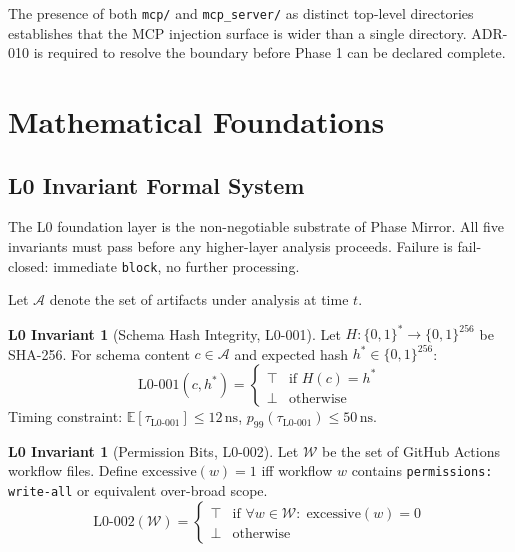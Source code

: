 \documentclass[12pt,a4paper]{article}
\theoremstyle{definition}
\newtheorem{invariant}[theorem]{L0 Invariant}
\theoremstyle{remark}
\begin{document}
The presence of both \texttt{mcp/} and \texttt{mcp\_server/} as distinct
top-level directories establishes that the MCP injection surface is wider
than a single directory. ADR-010 is required to resolve the boundary before
Phase 1 can be declared complete.


\section{Mathematical Foundations}

\subsection{L0 Invariant Formal System}

The L0 foundation layer is the non-negotiable substrate of Phase Mirror.
All five invariants must pass before any higher-layer analysis proceeds.
Failure is fail-closed: immediate \texttt{block}, no further processing.

Let $\mathcal{A}$ denote the set of artifacts under analysis at time $t$.

\begin{invariant}[Schema Hash Integrity, L0-001]
\label{inv:schema-hash}
Let $H: \{0,1\}^* \rightarrow \{0,1\}^{256}$ be SHA-256. For schema content
$c \in \mathcal{A}$ and expected hash $h^* \in \{0,1\}^{256}$:
\[
  \text{L0-001}(c, h^*) = \begin{cases}
    \top & \text{if } H(c) = h^* \\
    \bot & \text{otherwise}
  \end{cases}
\]
Timing constraint: $\mathbb{E}[\tau_{\text{L0-001}}] \leq 12\,\text{ns}$,
$p_{99}(\tau_{\text{L0-001}}) \leq 50\,\text{ns}$.
\end{invariant}

\begin{invariant}[Permission Bits, L0-002]
\label{inv:permission-bits}
Let $\mathcal{W}$ be the set of GitHub Actions workflow files.
Define $\text{excessive}(w) = 1$ iff workflow $w$ contains
\texttt{permissions: write-all} or equivalent over-broad scope.
\[
  \text{L0-002}(\mathcal{W}) = \begin{cases}
    \top & \text{if } \forall w \in \mathcal{W}:\; \text{excessive}(w) = 0 \\
    \bot & \text{otherwise}
  \end{cases}
\]
\end{invariant}
\end{document}
